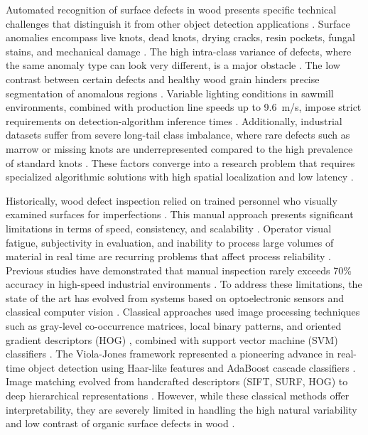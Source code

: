 \documentclass[pdflatex,sn-basic,Numbered,iicol]{sn-jnl}
\begin{document}
Automated recognition of surface defects in wood presents specific technical challenges that distinguish it from other object detection applications \citep{Shah2026Review}. Surface anomalies encompass live knots, dead knots, drying cracks, resin pockets, fungal stains, and mechanical damage \citep{Chen2023Recognition}. The high intra-class variance of defects, where the same anomaly type can look very different, is a major obstacle \citep{Kodytek2022Dataset}. The low contrast between certain defects and healthy wood grain hinders precise segmentation of anomalous regions \citep{minaee2022survey}. Variable lighting conditions in sawmill environments, combined with production line speeds up to 9.6~m/s, impose strict requirements on detection-algorithm inference times \citep{Kodytek2022Dataset}. Additionally, industrial datasets suffer from severe long-tail class imbalance, where rare defects such as marrow or missing knots are underrepresented compared to the high prevalence of standard knots \citep{Kodytek2022Dataset}. These factors converge into a research problem that requires specialized algorithmic solutions with high spatial localization and low latency \citep{prunella2023deep}.

Historically, wood defect inspection relied on trained personnel who visually examined surfaces for imperfections \citep{Kryl2020Inspection}. This manual approach presents significant limitations in terms of speed, consistency, and scalability \citep{Kryl2020Inspection}. Operator visual fatigue, subjectivity in evaluation, and inability to process large volumes of material in real time are recurring problems that affect process reliability \citep{Kryl2020Inspection}. Previous studies have demonstrated that manual inspection rarely exceeds 70\% accuracy in high-speed industrial environments \citep{Kodytek2022Dataset}. To address these limitations, the state of the art has evolved from systems based on optoelectronic sensors and classical computer vision \citep{ren2022state}. Classical approaches used image processing techniques such as gray-level co-occurrence matrices, local binary patterns, and oriented gradient descriptors (HOG) \citep{dalal2005hog}, combined with support vector machine (SVM) classifiers \citep{sugiarto2017wood,nurthohari2019wood}. The Viola-Jones framework \citep{viola2001rapid} represented a pioneering advance in real-time object detection using Haar-like features \citep{lienhart2002extended} and AdaBoost cascade classifiers \citep{ranftl2017tracking}. Image matching evolved from handcrafted descriptors (SIFT, SURF, HOG) to deep hierarchical representations \citep{ma2021image}. However, while these classical methods offer interpretability, they are severely limited in handling the high natural variability and low contrast of organic surface defects in wood \citep{prunella2023deep}.
\end{document}
